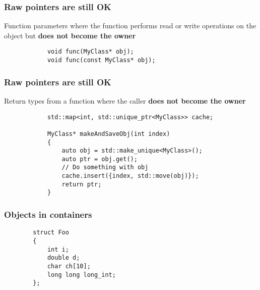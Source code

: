 \documentclass{beamer}
\begin{document}
\begin{frame}[fragile]
\frametitle{Raw pointers are still OK}
	Function parameters where the function performs read or write operations
	on the object but \textbf{does not become the owner}
	\begin{example}
		\begin{lstlisting}
			void func(MyClass* obj);
			void func(const MyClass* obj);
		\end{lstlisting}
	\end{example}
\end{frame}

\begin{frame}[fragile]
\frametitle{Raw pointers are still OK}
	Return types from a function where the caller \textbf{does not become the owner}
	\begin{example}
		\begin{lstlisting}
			std::map<int, std::unique_ptr<MyClass>> cache;
			
			MyClass* makeAndSaveObj(int index)
			{
				auto obj = std::make_unique<MyClass>();
				auto ptr = obj.get();
				// Do something with obj
				cache.insert({index, std::move(obj)});
				return ptr;
			}
		\end{lstlisting}
	\end{example}
\end{frame}

\begin{frame}[fragile,t]
\frametitle{Objects in containers}
    \begin{lstlisting}
        struct Foo
        {
            int i;
            double d;
            char ch[10];
            long long long_int;
        };
    \end{lstlisting}


\end{frame}
\end{document}

